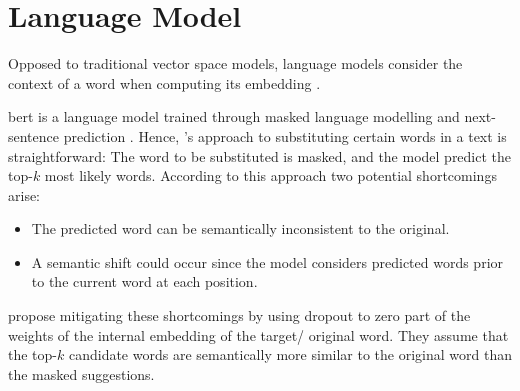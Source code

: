 \section{Language Model}
\label{sec:language_model}

Opposed to traditional vector space models, language models consider the context of a word when computing its embedding \citep{emmery_adversarial_2021}.


\ac{bert} is a language model trained through masked language modelling and next-sentence prediction \citep{emmery_adversarial_2021}.
Hence, \citet{emmery_adversarial_2021}'s approach to substituting certain words in a text is straightforward:
The word to be substituted is masked, and the model predict the top-$k$ most likely words.
According to this approach two potential shortcomings arise:
\begin{itemize}
    \item The predicted word can be semantically inconsistent to the original.
    \item A semantic shift could occur since the model considers predicted words prior to the current word at each position.
\end{itemize}
\citet{emmery_adversarial_2021} propose mitigating these shortcomings by using dropout to zero part of the weights of the internal embedding of the target/ original word.
They assume that the top-$k$ candidate words are semantically more similar to the original word than the masked suggestions.